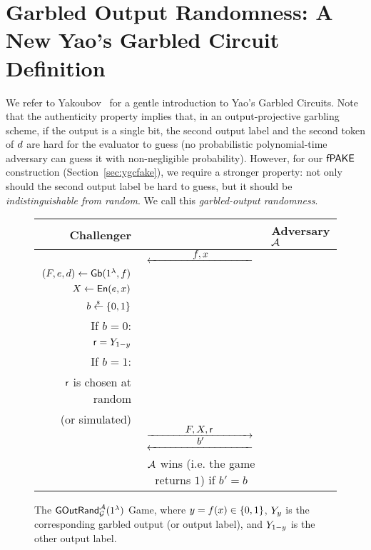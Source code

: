 
\section{Garbled Output Randomness: A New Yao's Garbled Circuit Definition}
\label{sec:garbledoutputrandomness}

We refer to Yakoubov~\cite{YGCintro} for a gentle introduction to Yao's Garbled Circuits.
Note that the authenticity property implies that, in an output-projective garbling scheme, if the output is a single bit, the second output label and the second token of $d$ are hard for the evaluator to guess (no probabilistic polynomial-time adversary can guess it with non-negligible probability). 
However, for our $\textsf{fPAKE}$ construction (Section~\ref{sec:ygcfake}), we require a stronger property: not only should the second output label be hard to guess, but it should be \emph{indistinguishable from random}. 
We call this \emph{garbled-output randomness}.

\begin{figure}
\centering
\begin{fboxenv}
\begin{tabular}{rcl}
Challenger & & Adversary $\mathcal{A}$ \\
\hline
& & \\
& $\Lflow{\func, \inp}{}$ & \\
\xspace\xspace\xspace $(F, e, d) \gets \mathsf{Gb}(1^{\lambda}, f)$ & & \\
\xspace\xspace\xspace $X \gets \mathsf{En}(e, x)$ & & \\
$b \stackrel{{}_\$}{\leftarrow} \{0,1\}$ & & \\
If $b = 0$: & & \\
\xspace\xspace\xspace $\mathsf{r} = Y_{1-y}$ & & \\
If $b = 1$: & & \\
\xspace\xspace\xspace $\mathsf{r}$ is chosen at random & & \\
\xspace\xspace\xspace (or simulated) & & \\
& $\Rflow{\gfunc, \ginp, \random}{}$ & \\
& $\Lflow{b'}{}$ & \\
& $\mathcal{A}$ wins (i.e. the game returns $1$) if $b' = b$  & \\
\end{tabular}
\end{fboxenv}
\caption{The $\mathsf{GOutRand}^{\mathcal{A}}_{\mathcal{G}}(1^{\lambda})$ Game, where $y = f(x) \in \{0,1\}$, $Y_{y}$ is the corresponding garbled output (or output label), and $Y_{1-y}$ is the other output label.}
\label{fig:garbledoutputrandomnessgame}
\end{figure}

